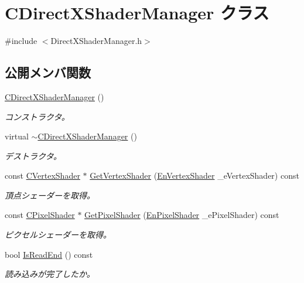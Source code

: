 \hypertarget{class_c_direct_x_shader_manager}{}\section{C\+Direct\+X\+Shader\+Manager クラス}
\label{class_c_direct_x_shader_manager}


{\ttfamily \#include $<$Direct\+X\+Shader\+Manager.\+h$>$}

\subsection*{公開メンバ関数}
\begin{DoxyCompactItemize}
\item 
\hyperlink{class_c_direct_x_shader_manager_a40710f22f33988c7ee6b2d0846738e46}{C\+Direct\+X\+Shader\+Manager} ()
\begin{DoxyCompactList}\small\item\em コンストラクタ。 \end{DoxyCompactList}\item 
virtual \hyperlink{class_c_direct_x_shader_manager_ad54969294f58847ac0bb1d91eabf7978}{$\sim$\+C\+Direct\+X\+Shader\+Manager} ()
\begin{DoxyCompactList}\small\item\em デストラクタ。 \end{DoxyCompactList}\item 
const \hyperlink{class_c_vertex_shader}{C\+Vertex\+Shader} $\ast$ \hyperlink{class_c_direct_x_shader_manager_abf4e16c5b7fca6755d01d1a1e4f7b623}{Get\+Vertex\+Shader} (\hyperlink{_shader_definition_8h_a232ca48c9a8e2a62b45a96e7929a2bdb}{En\+Vertex\+Shader} \+\_\+e\+Vertex\+Shader) const 
\begin{DoxyCompactList}\small\item\em 頂点シェーダーを取得。 \end{DoxyCompactList}\item 
const \hyperlink{class_c_pixel_shader}{C\+Pixel\+Shader} $\ast$ \hyperlink{class_c_direct_x_shader_manager_a04f2e46307dac941beffb075dc4f21e9}{Get\+Pixel\+Shader} (\hyperlink{_shader_definition_8h_ab8ae26d268e6e5baee47fbba4d03f4cf}{En\+Pixel\+Shader} \+\_\+e\+Pixel\+Shader) const 
\begin{DoxyCompactList}\small\item\em ピクセルシェーダーを取得。 \end{DoxyCompactList}\item 
bool \hyperlink{class_c_direct_x_shader_manager_a3099819b5ea0631e419485554d4e1095}{Is\+Read\+End} () const 
\begin{DoxyCompactList}\small\item\em 読み込みが完了したか。 \end{DoxyCompactList}\end{DoxyCompactItemize}
